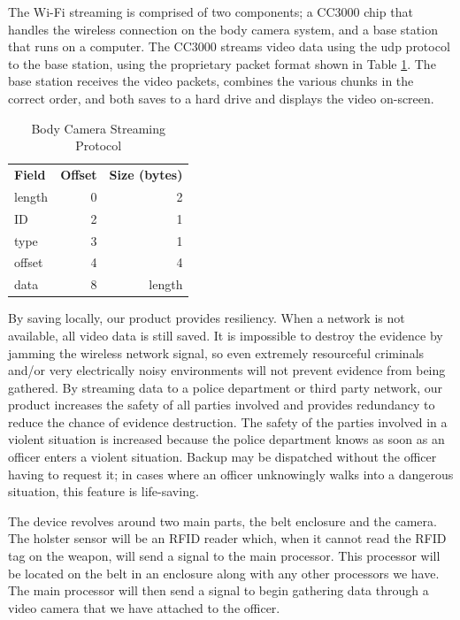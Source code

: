 \documentclass[12pt]{article}
\begin{document}
The Wi-Fi streaming is comprised of two components; a CC3000 chip that handles
the wireless connection on the body camera system, and a base station that runs
on a computer. The CC3000 streams video data using the \gls{udp} protocol to
the base station, using the proprietary packet format shown in Table
\ref{tab:packet_format}.  The base station receives the video packets, combines
the various chunks in the correct order, and both saves to a hard drive and
displays the video on-screen.

\begin{table}[h]
    \centering
    \caption{Body Camera Streaming Protocol}
    \begin{tabular}{lrr}
        \textbf{Field} & \textbf{Offset} & \textbf{Size (bytes)}\\
        length & 0 & 2\\
        ID & 2 & 1\\
        type & 3 & 1\\
        offset & 4 & 4\\
        data & 8 & length\\
    \end{tabular}
    \label{tab:packet_format}
\end{table}

By saving locally, our product provides resiliency. When a network is not
available, all video data is still saved. It is impossible to destroy the
evidence by jamming the wireless network signal, so even extremely resourceful
criminals and/or very electrically noisy environments will not prevent evidence
from being gathered. By streaming data to a police department or third party
network, our product increases the safety of all parties involved and provides
redundancy to reduce the chance of evidence destruction. The safety of the
parties involved in a violent situation is increased because the police
department knows as soon as an officer enters a violent situation. Backup may
be dispatched without the officer having to request it; in cases where an
officer unknowingly walks into a dangerous situation, this feature is
life-saving.

The device revolves around two main parts, the belt enclosure and the camera.
The holster sensor will be an RFID reader which, when it cannot read the RFID
tag on the weapon, will send a signal to the main processor. This processor
will be located on the belt in an enclosure along with any other processors we
have. The main processor will then send a signal to begin gathering data
through a video camera that we have attached to the officer. 
\end{document}
